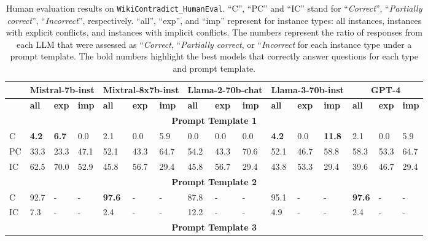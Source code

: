 \documentclass{article}
\begin{document}
\begin{table}[t]
   \caption{Human evaluation results on \texttt{WikiContradict\_HumanEval}. ``C'', ``PC'' and ``IC'' stand for ``\emph{Correct}'', ``\emph{Partially correct}'', ``\emph{Incorrect}'', respectively. ``all'', ``exp'', and ``imp'' represent for instance types: all instances, instances with explicit conflicts, and instances with implicit conflicts. The numbers represent the ratio of responses from each LLM that were assessed as ``\emph{Correct}, ``\emph{Partially correct}, or ``\emph{Incorrect} for each instance type under a prompt template. The bold numbers highlight the best models that correctly answer questions for  each type and prompt template.}
   \label{tab:humeval}
    \begin{footnotesize}
    \begin{tabular}{|p{0.25cm}|p{0.46cm}|p{0.475cm}|p{0.46cm}|p{0.46cm}|p{0.475cm}|p{0.46cm}|p{0.46cm}|p{0.46cm}|p{0.46cm}|p{0.46cm}|p{0.475cm}|p{0.46cm}|p{0.46cm}|p{0.475cm}|p{0.46cm}|}
   \hline
        & \multicolumn{3}{c|}{Mistral-7b-inst} & \multicolumn{3}{c|}{Mixtral-8x7b-inst} & \multicolumn{3}{c|}{Llama-2-70b-chat}& \multicolumn{3}{c|}{Llama-3-70b-inst} & \multicolumn{3}{c|}{GPT-4} \\ \hline
        ~ & \textbf{all}  & \textbf{exp}& \textbf{imp} & \textbf{all} & \textbf{exp} & \textbf{imp} & \textbf{all}  & \textbf{exp} & \textbf{imp}& \textbf{all} & \textbf{exp} & \textbf{imp} & \textbf{all}  & \textbf{exp} & \textbf{imp} \\ \hline
        \multicolumn{16}{|c|}{\textbf{Prompt Template 1}} \\ \hline
        C & \textbf{4.2} & \textbf{6.7} & 0.0 & 2.1 & 0.0 & 5.9 & 0.0 & 0.0 & 0.0 & \textbf{4.2} & 0.0 & \textbf{11.8} & 2.1 & 0.0 & 5.9 \\ \hline
        PC & 33.3 & 23.3 & 47.1 & 52.1 & 43.3 & 64.7 & 54.2 & 43.3 & 70.6 & 52.1 & 46.7 & 58.8 & 58.3 & 53.3 & 64.7 \\ \hline
        IC & 62.5 & 70.0 & 52.9 & 45.8 & 56.7 & 29.4 & 45.8 & 56.7 & 29.4 & 43.8 & 53.3 & 29.4 & 39.6 & 46.7 & 29.4 \\ \hline
        \multicolumn{16}{|c|}{\textbf{Prompt Template 2}}\\ \hline
        C & 92.7 & - & - & \textbf{97.6} & - & - & 87.8 & - & - & 95.1 & - & - & \textbf{97.6} & - & - \\ \hline
        IC & 7.3 & - & - & 2.4 & - & - & 12.2 & - & - & 4.9 & - & - & 2.4 & - & - \\ \hline
        \multicolumn{16}{|c|}{\textbf{Prompt Template 3}}\\ \hline

\end{tabular}
\end{footnotesize}
\end{table}
\end{document}
